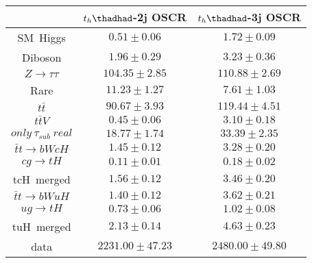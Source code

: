 \centering
\begin{tabular}{ccc} \toprule\toprule
 & $t_{h}\thadhad$-2j OSCR & $t_{h}\thadhad$-3j OSCR\\  \midrule
\hspace{9mm}SM~Higgs & $0.51\pm0.06$ & $1.72\pm0.09$\\
\hspace{9mm}Diboson & $1.96\pm0.29$ & $3.23\pm0.36$\\
\hspace{9mm}$Z\to\tau\tau$ & $104.35\pm2.85$ & $110.88\pm2.69$\\
\hspace{9mm}Rare & $11.23\pm1.27$ & $7.61\pm1.03$\\
\hspace{9mm}$t\bar{t}$ & $90.67\pm3.93$ & $119.44\pm4.51$\\
\hspace{9mm}$t\bar{t}V$ & $0.45\pm0.06$ & $3.10\pm0.18$\\
\hspace{9mm}$only~\tau_{sub}~real$ & $18.77\pm1.74$ & $33.39\pm2.35$\\\midrule
\hspace{9mm}$\bar{t}t\to bWcH$ & $1.45\pm0.12$ & $3.28\pm0.20$\\
\hspace{9mm}$cg\to tH$ & $0.11\pm0.01$ & $0.18\pm0.02$\\
tcH~merged & $1.56\pm0.12$ & $3.46\pm0.20$\\
\hspace{9mm}$\bar{t}t\to bWuH$ & $1.40\pm0.12$ & $3.62\pm0.21$\\
\hspace{9mm}$ug\to tH$ & $0.73\pm0.06$ & $1.02\pm0.08$\\
tuH~merged & $2.13\pm0.14$ & $4.63\pm0.23$\\\midrule
data & $2231.00\pm47.23$ & $2480.00\pm49.80$\\
\bottomrule\bottomrule
\end{tabular}

